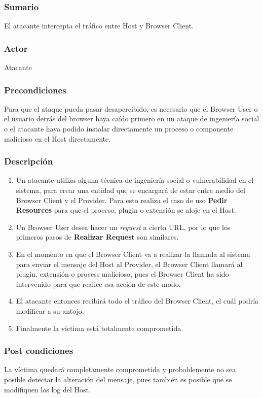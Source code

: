 \documentclass{sig-alternate-05-2015}
\begin{document}
  
  \subsubsection{Sumario} El atacante intercepta el tráfico entre Host y Browser Client.
  \subsubsection{Actor} Atacante
  \subsubsection{Precondiciones} Para que el ataque pueda pasar desapercibido, es necesario que el Browser User o el usuario detrás del browser haya caído primero en un ataque de ingeniería social o el atacante haya podido instalar directamente un proceso o componente malicioso en el Host directamente.
  \subsubsection{Descripción}
      \begin{enumerate}
        \item Un atacante utiliza alguna técnica de ingeniería social o vulnerabilidad en el sistema, para crear una entidad que se encargará de estar entre medio del Browser Client y el Provider. Para esto realiza el caso de uso \textbf{Pedir Resources} para que el proceso, plugin o extensión se aloje en el Host.
        \item Un Browser User desea hacer un \textit{request} a cierta URL, por lo que los primeros pasos de \textbf{Realizar Request} son similares.
        \item En el momento en que el Browser Client va a realizar la llamada al sistema para enviar el mensaje del Host al Provider, el Browser Client llamará al plugin, extensión o process malicioso, pues el Browser Client ha sido intervenido para que realice esa acción de este modo.
        \item El atacante entonces recibirá todo el tráfico del Browser Client, el cuál podría modificar a su antojo.
        \item Finalmente la víctima está totalmente comprometida.
      \end{enumerate}
  \subsubsection{Post condiciones} La víctima quedará completamente comprometida y probablemente no sea posible detectar la alteración del mensaje, pues también es posible que se modifiquen los log del Host.
\end{document}
